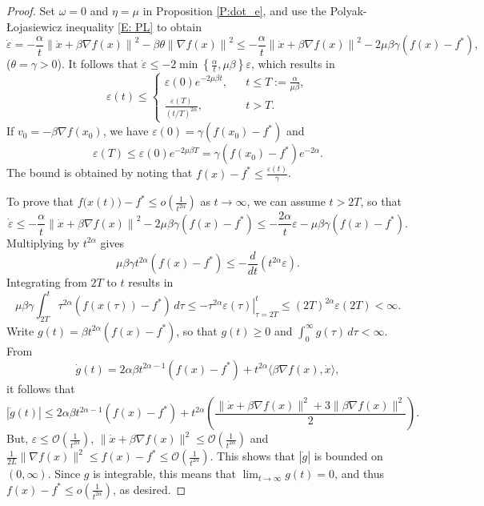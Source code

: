 \documentclass[onefignum,onetabnum]{siamart220329}
\begin{document}
\begin{proof}
Set $\omega=0$ and $\eta=\mu$ in Proposition \ref{P:dot_e}, and use the Polyak-\L ojasiewicz inequality \eqref{E: PL} to obtain
$$\dot{\varepsilon} 
= - \frac{\alpha}{t}\left\| \dot{x} + \beta\nabla f(x) \right\|^2 - \beta\theta \left\| \nabla f(x) \right\|^2
\le - \frac{\alpha}{t}\left\| \dot{x} + \beta\nabla f(x) \right\|^2
- 2\mu\beta\gamma (f(x) - f^*),$$
($\theta=\gamma>0$). It follows that $ \dot{\varepsilon} \le - 2\min\left\{ \frac{\alpha}{t}, \mu\beta \right\} \varepsilon$, which results in
\begin{equation*}
\varepsilon(t) \le \left\{
\begin{array}{rcl}
\varepsilon(0) e^{-2\mu\beta t}, & & t \le T:=\frac{\alpha}{\mu\beta},\\
\frac{\varepsilon(T)}{ \left( t/T \right)^{2\alpha} }, & & t > T. 
\end{array}
\right.
\end{equation*}
If $v_0 = -\beta\nabla f(x_0)$, we have $\varepsilon(0) = \gamma\left( f(x_0) - f^* \right)$ and $$\varepsilon(T) \le \varepsilon(0) e^{-2\mu\beta T} = \gamma\left( f(x_0) - f^* \right) e^{-2\alpha}.$$
The bound is obtained by noting that $f(x) - f^* \le \frac{\varepsilon(t)}{\gamma}$. 

To prove that $f\big(x(t)\big) - f^* \le o\left( \frac{1}{t^{2\alpha}} \right)$ as $t\to\infty$, we can assume $t > 2 T$, so that
$$\dot{\varepsilon} 
\le - \frac{\alpha}{t}\left\| \dot{x} + \beta\nabla f(x) \right\|^2
- 2\mu\beta\gamma (f(x) - f^*)
\le - \frac{2\alpha}{t}\varepsilon - \mu\beta\gamma( f(x) - f^* ). $$
Multiplying by $t^{2\alpha}$ gives
$$ \mu\beta\gamma t^{2\alpha}( f(x) - f^* ) \le -\frac{d}{dt}\left( t^{2\alpha}\varepsilon \right). $$
Integrating from $2T$ to $t$ results in
$$ \mu\beta\gamma \int_{2T}^{t} \tau^{2\alpha} ( f(x(\tau)) - f^* )\,d\tau \le -  
\left. \tau^{2\alpha}\varepsilon(\tau)\right|_{\tau=2T}^t
\le (2T)^{2\alpha}\varepsilon(2T) < \infty. $$
Write $g(t) = \beta t^{2\alpha}( f(x) - f^* )$, so that $g(t)\ge 0$ and $\int_{0}^{\infty} g(\tau)\,d\tau < \infty$. From
$$ \dot{g}(t) = 2\alpha\beta t^{2\alpha-1}( f(x) - f^* ) + t^{2\alpha}\langle \beta \nabla f(x), \dot{x} \rangle,$$
it follows that
$$| \dot{g}(t) | 
\le  2\alpha\beta t^{2\alpha-1}( f(x) - f^* ) + t^{2\alpha} \left( \frac{ \| \dot{x} + \beta\nabla f(x) \|^2 + 3\| \beta\nabla f(x) \|^2  }{2} \right).$$
But, $\varepsilon\le\mathcal O(\frac{1}{t^{2\alpha}})$, $\| \dot{x} + \beta\nabla f(x) \|^2\le\mathcal O(\frac{1}{t^{2\alpha}})$ and $\frac{1}{2L}\| \nabla f(x) \|^2\le f(x) - f^*\le\mathcal O(\frac{1}{t^{2\alpha}})$. This shows that $|\dot g|$ is bounded on $(0,\infty)$. Since $g$ is integrable, this means that $\lim_{t\to\infty} g(t) = 0 $, and thus $f(x) - f^* \le o\left( \frac{1}{t^{2\alpha}}  \right)$, as desired.
\end{proof}
\end{document}

